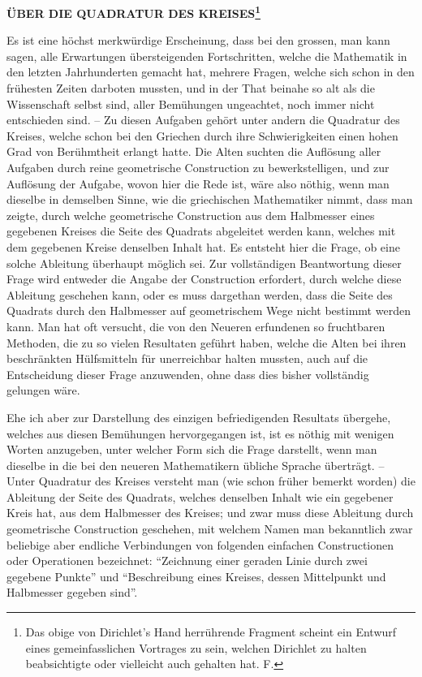 \documentclass[11pt]{article}
\begin{document}
\begin{center}
{\Large\bfseries ÜBER DIE QUADRATUR DES KREISES\footnote{Das obige von Dirichlet's Hand herrührende Fragment scheint ein Entwurf eines gemeinfasslichen Vortrages zu sein, welchen Dirichlet zu halten beabsichtigte oder vielleicht auch gehalten hat. F.}\par}
\vspace{0.8em}
\end{center}

Es ist eine höchst merkwürdige Erscheinung, dass bei den grossen, man kann sagen, alle Erwartungen übersteigenden Fortschritten, welche die Mathematik in den letzten Jahrhunderten gemacht hat, mehrere Fragen, welche sich schon in den frühesten Zeiten darboten mussten, und in der That beinahe so alt als die Wissenschaft selbst sind, aller Bemühungen ungeachtet, noch immer nicht entschieden sind. -- Zu diesen Aufgaben gehört unter andern die Quadratur des Kreises, welche schon bei den Griechen durch ihre Schwierigkeiten einen hohen Grad von Berühmtheit erlangt hatte. Die Alten suchten die Auflösung aller Aufgaben durch reine geometrische Construction zu bewerkstelligen, und zur Auflösung der Aufgabe, wovon hier die Rede ist, wäre also nöthig, wenn man dieselbe in demselben Sinne, wie die griechischen Mathematiker nimmt, dass man zeigte, durch welche geometrische Construction aus dem Halbmesser eines gegebenen Kreises die Seite des Quadrats abgeleitet werden kann, welches mit dem gegebenen Kreise denselben Inhalt hat. Es entsteht hier die Frage, ob eine solche Ableitung überhaupt möglich sei. Zur vollständigen Beantwortung dieser Frage wird entweder die Angabe der Construction erfordert, durch welche diese Ableitung geschehen kann, oder es muss dargethan werden, dass die Seite des Quadrats durch den Halbmesser auf geometrischem Wege nicht bestimmt werden kann. Man hat oft versucht, die von den Neueren erfundenen so fruchtbaren Methoden, die zu so vielen Resultaten geführt haben, welche die Alten bei ihren beschränkten Hülfsmitteln für unerreichbar halten mussten, auch auf die Entscheidung dieser Frage anzuwenden, ohne dass dies bisher vollständig gelungen wäre.

Ehe ich aber zur Darstellung des einzigen befriedigenden Resultats übergehe, welches aus diesen Bemühungen hervorgegangen ist, ist es nöthig mit wenigen Worten anzugeben, unter welcher Form sich die Frage darstellt, wenn man dieselbe in die bei den neueren Mathematikern übliche Sprache überträgt. -- Unter Quadratur des Kreises versteht man (wie schon früher bemerkt worden) die Ableitung der Seite des Quadrats, welches denselben Inhalt wie ein gegebener Kreis hat, aus dem Halbmesser des Kreises; und zwar muss diese Ableitung durch geometrische Construction geschehen, mit welchem Namen man bekanntlich zwar beliebige aber endliche Verbindungen von folgenden einfachen Constructionen oder Operationen bezeichnet: ``Zeichnung einer geraden Linie durch zwei gegebene Punkte'' und ``Beschreibung eines Kreises, dessen Mittelpunkt und Halbmesser gegeben sind''.
\end{document}
